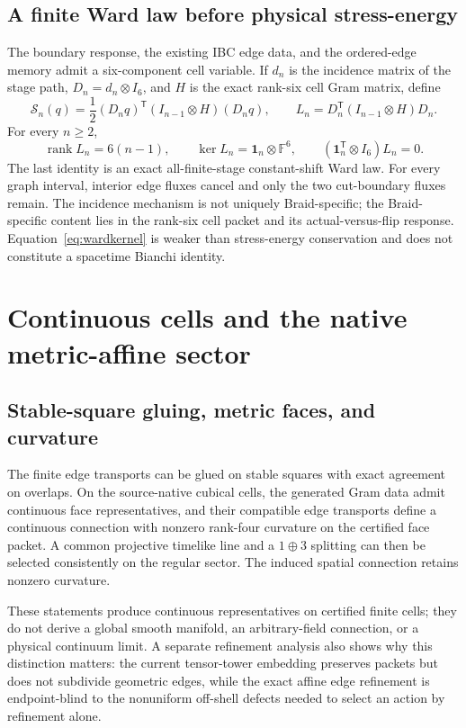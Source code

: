 \documentclass[11pt]{article}
\theoremstyle{definition}
\theoremstyle{remark}
\newcommand{\rank}{\operatorname{rank}}
\begin{document}
\subsection{A finite Ward law before physical stress-energy}

The boundary response, the existing IBC edge data, and the ordered-edge memory admit a six-component cell variable. If $d_n$ is the incidence matrix of the stage path, $D_n=d_n\otimes I_6$, and $H$ is the exact rank-six cell Gram matrix, define
\begin{equation}\label{eq:wardaction}
 \mathcal S_n(q)=\frac12(D_nq)^{\mathsf T}(I_{n-1}\otimes H)(D_nq),
 \qquad
 L_n=D_n^{\mathsf T}(I_{n-1}\otimes H)D_n.
\end{equation}
For every $n\ge2$,
\begin{equation}\label{eq:wardkernel}
 \rank L_n=6(n-1),\qquad
 \ker L_n=\mathbf1_n\otimes\mathbb F^6,
 \qquad
 (\mathbf1_n^{\mathsf T}\otimes I_6)L_n=0.
\end{equation}
The last identity is an exact all-finite-stage constant-shift Ward law. For every graph interval, interior edge fluxes cancel and only the two cut-boundary fluxes remain. The incidence mechanism is not uniquely Braid-specific; the Braid-specific content lies in the rank-six cell packet and its actual-versus-flip response. Equation~\eqref{eq:wardkernel} is weaker than stress-energy conservation and does not constitute a spacetime Bianchi identity.

\section{Continuous cells and the native metric-affine sector}

\subsection{Stable-square gluing, metric faces, and curvature}

The finite edge transports can be glued on stable squares with exact agreement on overlaps. On the source-native cubical cells, the generated Gram data admit continuous face representatives, and their compatible edge transports define a continuous connection with nonzero rank-four curvature on the certified face packet. A common projective timelike line and a $1\oplus3$ splitting can then be selected consistently on the regular sector. The induced spatial connection retains nonzero curvature.

These statements produce continuous representatives on certified finite cells; they do not derive a global smooth manifold, an arbitrary-field connection, or a physical continuum limit. A separate refinement analysis also shows why this distinction matters: the current tensor-tower embedding preserves packets but does not subdivide geometric edges, while the exact affine edge refinement is endpoint-blind to the nonuniform off-shell defects needed to select an action by refinement alone.
\end{document}

